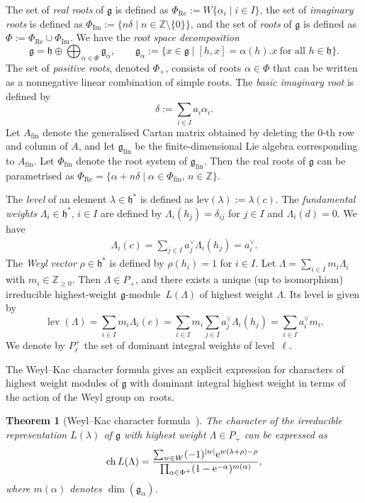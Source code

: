 \documentclass[10pt,a4paper]{amsart}
\numberwithin{equation}{section}
\newtheorem{Theorem}{Theorem}[section]
\theoremstyle{definition}
\begin{document}
The set of \emph{real roots} of $\mathfrak{g}$ is defined as $\Phi_{\mathrm{Re}}:= W\{\alpha_i \mid i\in I\}$, the set of \emph{imaginary roots} is defined as $\Phi_{\mathrm{Im}}:=\{n\delta \mid n\in\mathbb Z\setminus\{0\}\}$, and the set of \emph{roots} of $\mathfrak{g}$ is defined as $\Phi:=\Phi_{\mathrm{Re}}\cup\Phi_{\mathrm{Im}}$. We have the \emph{root space decomposition}
\[
\mathfrak{g} = \mathfrak{h}  \oplus  \bigoplus_{\alpha \in \Phi} \mathfrak{g}_{\alpha},
\qquad
\mathfrak{g}_{\alpha} := \{ x \in \mathfrak{g} \mid [h,x] = \alpha(h).x \ \text{for all } h \in \mathfrak{h} \}.
\]
The set of \emph{positive roots}, denoted $\Phi_+$, consists of roots $\alpha\in\Phi$ that can be written as a nonnegative linear combination of simple roots. The \emph{basic imaginary root} is defined by
\[
\delta:=\sum_{i\in I} a_i \alpha_i.
\]
Let $A_{\mathrm{fin}}$ denote the generalised Cartan matrix obtained by deleting the $0$-th row and column of $A$, and let $\mathfrak{g}_{\mathrm{fin}}$ be the finite-dimensional Lie algebra corresponding to $A_{\mathrm{fin}}$.
Let $\Phi_{\mathrm{fin}}$ denote the root system of $\mathfrak{g}_{\mathrm{fin}}$. Then the real roots of $\mathfrak g$ can be parametrised as $\Phi_{\mathrm{Re}}
 = \{ \alpha + n\delta \mid \alpha\in \Phi_{\mathrm{fin}},\, n\in\mathbb Z \}$.

 The \emph{level} of an element $\lambda \in \mathfrak{h}^*$ is defined as $\mathrm{lev}(\lambda) := \lambda(c)$. The \emph{fundamental weights} $\Lambda_i\in\mathfrak h^{*}$, $i\in I$ are defined by $\Lambda_i(h_j)=\delta_{ij}$ for $j\in I$ and $\Lambda_i(d)=0$. We have
 \begin{align*}
 \Lambda_i(c)=\sum_{j\in I}a_j^\vee\Lambda_i(h_j)=a_i^\vee.
 \end{align*}
 The \emph{Weyl vector} $\rho\in\mathfrak h^{*}$ is defined by $\rho(h_i)=1$ for $i\in I$. Let $\Lambda=\sum_{i\in I} m_i\Lambda_i$ with ${m_i\in\mathbb Z_{\ge0}}$.
Then $\Lambda\in P_{+}$, and there exists a unique (up to isomorphism) irreducible highest-weight
$\mathfrak g$\nobreakdash-module~$L(\Lambda)$ of highest weight $\Lambda$. Its level is given by
\[
\operatorname{lev}(\Lambda)=\sum_{i\in I} m_i\Lambda_i(c)=\sum_{i\in I}m_i\sum_{j\in I}a_j^\vee\Lambda_i(h_j)=\sum_{i\in I}a_i^\vee m_i.
\]
We denote by $P_\ell^+$ the set of dominant integral weights of level~$\ell$.

The Weyl--Kac character formula gives an explicit expression for characters of highest weight modules of $\mathfrak{g}$ with dominant integral highest weight in terms of the action of the Weyl group on~roots.
\begin{Theorem}[{Weyl--Kac character formula~\cite[Theorem~10.4]{Kac90}}]
The character of the irreducible representation $L(\lambda)$ of $\mathfrak{g}$ with highest weight $ \Lambda \in P_+$ can be expressed as
\begin{align*}
\operatorname{ch}L(\Lambda) = \frac{\sum_{w \in W} (-1)^{|w|} {\rm e}^{w(\lambda + \rho) - \rho}}{\prod_{\alpha \in \Phi^+} (1 - {\rm e}^{-\alpha})^{m(\alpha)}},
\end{align*}
where $m(\alpha)$ denotes $\dim (\mathfrak{g}_{\alpha})$.
\end{Theorem}
\end{document}
